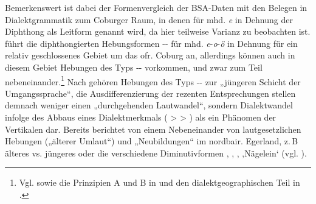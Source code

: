 Bemerkenswert ist dabei der Formenvergleich der BSA-Daten mit den Belegen in  Dialektgrammatik zum Coburger Raum, in denen für mhd. \textit{e} in Dehnung der Diphthong  als Leitform genannt wird, da hier teilweise Varianz zu beobachten ist. \citet[36]{Koß1967} führt die diphthongierten Hebungsformen -- für mhd. \textit{e}{}-\textit{o}{}-\textit{ö} in Dehnung für ein relativ geschlossenes Gebiet um das ofr. Coburg an, allerdings können auch in diesem Gebiet Hebungen des Typs -- vorkommen, und zwar zum Teil nebeneinander.\footnote{Vgl. \citet[37, FN 88]{Koß1967} sowie die Prinzipien A und B in \citet[§28]{Werner1961} und den dialektgeographischen Teil in \citet[§24]{Niederlöhner1937}.} Nach \citet[36]{Koß1967} gehören Hebungen des Typs -- zur „jüngeren Schicht der Umgangssprache“, die Ausdifferenzierung der rezenten Entsprechungen stellen demnach weniger einen „durchgehenden Lautwandel“, sondern Dialektwandel infolge des Abbaus eines Dialektmerkmals ( > > ) als ein Phänomen der Vertikalen dar. Bereits \citet[64]{Roth1940} berichtet von einem Nebeneinander von lautgesetzlichen Hebungen („älterer Umlaut“) und „Neubildungen“ im nordbair. Egerland, z.\,B älteres  vs. jüngeres  oder die verschiedene Diminutivformen , , ,  ‚Nägelein‘ (vgl. \citealt[64]{Trukenbrod1973}).

